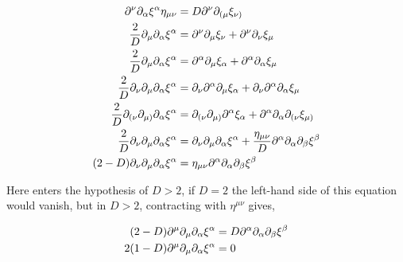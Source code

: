 \begin{align*}
    \partial^\nu\partial_\alpha\xi^\alpha\eta_{\mu\nu}&=D\partial^\nu\partial_{(\mu}\xi_{\nu)}\\
    \frac2D\partial_\mu\partial_\alpha\xi^\alpha&=\partial^\nu\partial_{\mu}\xi_{\nu}+\partial^\nu\partial_{\nu}\xi_{\mu}\\
    \frac2D\partial_\mu\partial_\alpha\xi^\alpha&=\partial^\alpha\partial_{\mu}\xi_{\alpha}+\partial^\alpha\partial_{\alpha}\xi_{\mu}\\
    \frac2D\partial_\nu\partial_\mu\partial_\alpha\xi^\alpha&=\partial_\nu\partial^\alpha\partial_{\mu}\xi_{\alpha}+\partial_\nu\partial^\alpha\partial_{\alpha}\xi_{\mu}\\
    \frac2D\partial_{(\nu}\partial_{\mu)}\partial_\alpha\xi^\alpha&=\partial_{(\nu}\partial_{\mu)}\partial^\alpha\xi_{\alpha}+\partial^\alpha\partial_{\alpha}\partial_{(\nu}\xi_{\mu)}\\
    \frac2D\partial_{\nu}\partial_{\mu}\partial_\alpha\xi^\alpha&=\partial_{\nu}\partial_{\mu}\partial_\alpha\xi^{\alpha}+\frac{\eta_{\mu\nu}}{D}\partial^\alpha\partial_{\alpha}\partial_{\beta}\xi^\beta\\
    \qty(2-D)\partial_{\nu}\partial_{\mu}\partial_\alpha\xi^\alpha&=\eta_{\mu\nu}\partial^\alpha\partial_{\alpha}\partial_{\beta}\xi^\beta
\end{align*}

Here enters the hypothesis of $D>2$, if $D=2$ the left-hand side of this equation would vanish, but in $D>2$, contracting with $\eta^{\mu\nu}$ gives,

\begin{align*}
    \qty(2-D)\partial^{\mu}\partial_{\mu}\partial_\alpha\xi^\alpha&=D\partial^\alpha\partial_{\alpha}\partial_{\beta}\xi^\beta\\
    2\qty(1-D)\partial^{\mu}\partial_{\mu}\partial_\alpha\xi^\alpha&=0
\end{align*}

\probitem{}